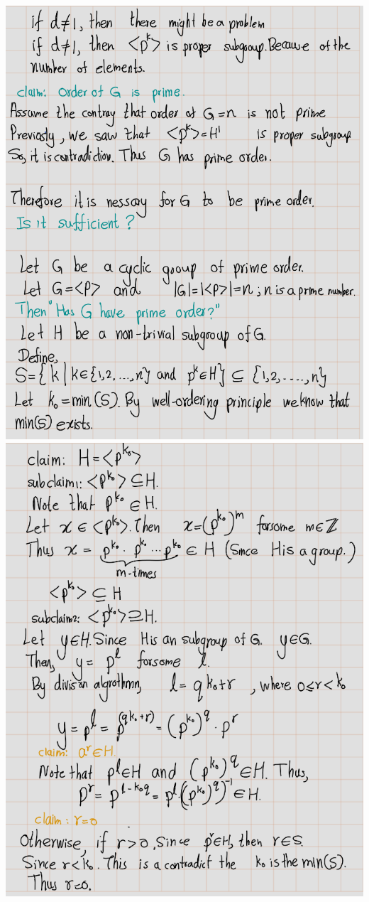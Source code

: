 \documentclass[
]{book}
\theoremstyle{definition}
\theoremstyle{definition}
\theoremstyle{definition}
\theoremstyle{definition}
\theoremstyle{remark}
\begin{document}
\includegraphics{figures/ch_2/fig56.png}
\includegraphics{figures/ch_2/fig57.png}
\end{document}
